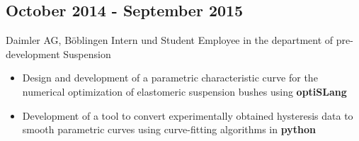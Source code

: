\documentclass{mycv}
\begin{document}
\begin{paracol}{2}
\subsection{October 2014 - September 2015}{Daimler AG, B{\"o}blingen}
{Intern und Student Employee in the department of pre-development
	Suspension}
	  \begin{itemize}
			\item Design and development of a parametric characteristic curve for the
				numerical optimization of elastomeric suspension bushes using
				{\bfseries optiSLang}
			\item Development of a tool to convert experimentally obtained hysteresis
				data to smooth parametric curves using curve-fitting algorithms in
				{\bfseries python}
		\end{itemize}
\end{paracol}
\end{document}
